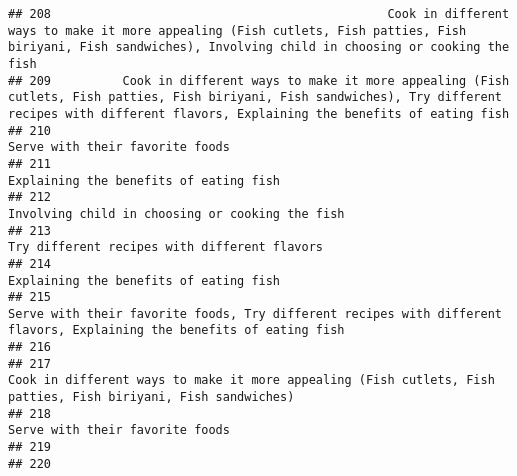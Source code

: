 \documentclass[
]{article}
\begin{document}
\begin{verbatim}
## 208                                               Cook in different ways to make it more appealing (Fish cutlets, Fish patties, Fish biriyani, Fish sandwiches), Involving child in choosing or cooking the fish
## 209          Cook in different ways to make it more appealing (Fish cutlets, Fish patties, Fish biriyani, Fish sandwiches), Try different recipes with different flavors, Explaining the benefits of eating fish
## 210                                                                                                                                                                              Serve with their favorite foods
## 211                                                                                                                                                                       Explaining the benefits of eating fish
## 212                                                                                                                                                              Involving child in choosing or cooking the fish
## 213                                                                                                                                                                 Try different recipes with different flavors
## 214                                                                                                                                                                       Explaining the benefits of eating fish
## 215                                                                                        Serve with their favorite foods, Try different recipes with different flavors, Explaining the benefits of eating fish
## 216                                                                                                                                                                                                             
## 217                                                                                                Cook in different ways to make it more appealing (Fish cutlets, Fish patties, Fish biriyani, Fish sandwiches)
## 218                                                                                                                                                                              Serve with their favorite foods
## 219                                                                                                                                                                                                             
## 220                                                                                                                                                                                                             

\end{verbatim}
\end{document}
